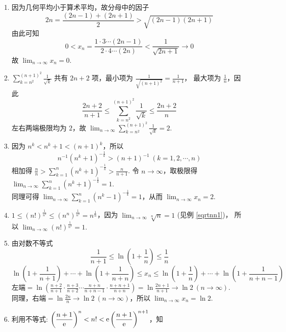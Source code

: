 \begin{solution}
    \begin{enumerate}[label=(\arabic{*})]
        \item 因为几何平均小于算术平均，故分母中的因子
              $$2n=\frac{(2n-1)+(2n+1)}{2}>\sqrt{(2n-1)(2n+1)}$$
              由此可知 $$0<x_n=\frac{1\cdot3\cdots(2n-1)}{2\cdot4\cdots(2n)}<\frac{1}{\sqrt{2n+1}}\to0$$
              故 $\displaystyle\lim_{n\to\infty}x_n=0.$
        \item $\displaystyle\sum_{k=n^2}^{(n+1)^2}\frac{1}{\sqrt{k}}$ 共有 $2n+2$ 项，最小项为 $\displaystyle\frac{1}{\sqrt{(n+1)^2}}=\frac{1}{n+1}$，
              最大项为 $\displaystyle\frac{1}{n}$，因此
              $$\frac{2n+2}{n+1}\leqslant\sum_{k=n^2}^{(n+1)^2}\frac{1}{\sqrt{k}}\leqslant\frac{2n+2}{n}$$
              左右两端极限均为 $2$，故 $\displaystyle\lim_{n\to\infty}\sum_{k=n^2}^{(n+1)^2}\frac{1}{\sqrt{k}}=2.$
        \item 因为 $n^k<n^k+1<(n+1)^k$，所以
              $$n^{-1}(n^k+1)^{-\frac{1}{k}}>(n+1)^{-1}~ (k=1,2,\cdots,n)$$
              相加得 $\displaystyle\frac{n}{n}>\sum_{k=1}^{n}(n^k+1)^{-\frac{1}{k}}>\frac{n}{n+1}$.
              令 $n\to\infty$，取极限得 $\displaystyle\lim_{n\to\infty}\sum_{k=1}^{n}(n^k+1)^{-\frac{1}{k}}=1$.\\
              同理可得 $\displaystyle\lim_{n\to\infty}\sum_{k=1}^{n}(n^k-1)^{-\frac{1}{k}}=1$，从而 $\displaystyle\lim_{n\to\infty}x_n=2.$
        \item $\displaystyle 1\leqslant (n!)^{\frac{1}{n^2}}\leqslant (n^n)^{\frac{1}{n^2}}=n^{\frac{1}{n}}$，因为 $\displaystyle\lim_{n\to\infty}\sqrt[n]{n}=1$ (见例 \ref{sqrtnn1})，
              所以 $\displaystyle\lim_{n\to\infty}(n!)^{\frac{1}{n^2}}=1.$
        \item 由对数不等式 $$\frac{1}{n+1}\leqslant\ln\left(1+\frac{1}{n}\right)\leqslant\frac{1}{n}$$
              $$\ln\left(1+\frac{1}{n+1}\right)+\cdots+\ln\left(1+\frac{1}{n+n}\right)\leqslant x_n\leqslant \ln\left(1+\frac{1}{n}\right)+\cdots+\ln\left(1+\frac{1}{n+n-1}\right)$$
              $\displaystyle\text{左端}=\ln\left(\frac{n+2}{n+1}\cdot\frac{n+3}{n+2}\cdots\frac{n+n}{n+n-1}\cdot\frac{n+n+1}{n+n}\right)=\ln\frac{2n+1}{n+1}\to\ln2~ (n\to\infty)$.\\
              同理，右端$=\displaystyle\ln\frac{2n}{n}\to\ln2~ (n\to\infty)$，所以 $\displaystyle\lim_{n\to\infty}x_n=\ln 2.$
        \item 利用不等式: $\displaystyle\left(\frac{n+1}{\mathrm{e} }\right)^n< n!<\mathrm{e} \left(\frac{n+1}{\mathrm{e} }\right)^{n+1}$，知

\end{enumerate}
\end{solution}
